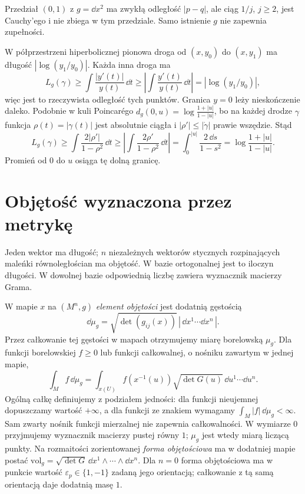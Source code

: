 \begin{przyklad}
Przedział $(0,1)$ z $g=\dd x^2$ ma zwykłą
odległość $|p-q|$, ale ciąg $1/j$, $j\geq2$, jest
Cauchy'ego i nie zbiega w tym przedziale.
Samo istnienie $g$ nie zapewnia zupełności.

W półprzestrzeni hiperbolicznej pionowa droga
od $(x,y_0)$ do $(x,y_1)$ ma długość
$|\log(y_1/y_0)|$. Każda inna droga ma
\[
 L_g(\gamma)\geq\int\frac{|y'(t)|}{y(t)}\,\dd t
 \geq\left|\int\frac{y'(t)}{y(t)}\,\dd t\right|
 =|\log(y_1/y_0)|,
\]
więc jest to rzeczywista odległość tych punktów.
Granica $y=0$ leży nieskończenie daleko.
Podobnie w kuli Poincarégo
$d_g(0,u)=\log\frac{1+|u|}{1-|u|}$,
bo na każdej drodze $\gamma$ funkcja
$\rho(t)=|\gamma(t)|$ jest absolutnie ciągła
i $|\rho'|\leq|\dot\gamma|$ prawie wszędzie.
Stąd
\[
 L_g(\gamma)\geq\int\frac{2|\rho'|}{1-\rho^2}\,\dd t
 \geq\left|\int\frac{2\rho'}{1-\rho^2}\,\dd t\right|
 =\int_0^{|u|}\frac{2\,\dd s}{1-s^2}
 =\log\frac{1+|u|}{1-|u|}.
\]
Promień od $0$ do $u$ osiąga tę dolną granicę.
\end{przyklad}

\section{Objętość wyznaczona przez metrykę}
\label{sec:metryka-objetosc}

Jeden wektor ma długość; $n$ niezależnych
wektorów stycznych rozpinających maleńki
równoległościan ma objętość. W bazie
ortogonalnej jest to iloczyn długości.
W dowolnej bazie odpowiednią liczbę
zawiera wyznacznik macierzy Grama.

\begin{definicja}
\label{def:miara-riemannowska}
W mapie $x$ na $(M^n,g)$ \emph{element objętości}
jest dodatnią gęstością
\begin{equation}\label{eq:element-objetosci}
 \dd\mu_g=\sqrt{\det(g_{ij}(x))}\,
                 |\,\dd x^1\cdots\dd x^n\,|.
\end{equation}
Przez całkowanie tej gęstości w mapach
otrzymujemy miarę borelowską $\mu_g$.
Dla funkcji borelowskiej $f\geq0$ lub funkcji całkowalnej,
o nośniku zawartym w jednej mapie,
\[
 \int_M f\,\dd\mu_g
  =\int_{x(U)} f(x^{-1}(u))
      \sqrt{\det G(u)}\,\dd u^1\cdots\dd u^n.
\]
Ogólną całkę definiujemy z podziałem jedności:
dla funkcji nieujemnej dopuszczamy wartość $+\infty$,
a dla funkcji ze znakiem wymagamy $\int_M|f|\,\dd\mu_g<\infty$.
Sam zwarty nośnik funkcji mierzalnej nie zapewnia całkowalności.
W wymiarze $0$ przyjmujemy wyznacznik macierzy pustej równy $1$;
$\mu_g$ jest wtedy miarą liczącą punkty. Na rozmaitości zorientowanej
\emph{forma objętościowa} ma w dodatniej mapie postać
$\mathrm{vol}_g=\sqrt{\det G}\,
 \dd x^1\wedge\cdots\wedge\dd x^n$.
Dla $n=0$ forma objętościowa ma w punkcie wartość
$\varepsilon_p\in\{1,-1\}$ zadaną jego orientacją;
całkowanie z tą samą orientacją daje dodatnią masę $1$.
\end{definicja}

